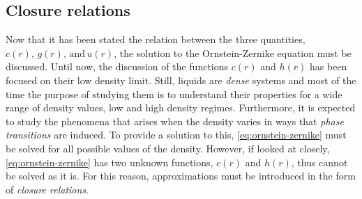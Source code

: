 \subsection{Closure relations}
Now that it has been stated the relation between the three quantities, 
$c(r), \, g(r), \, \text{and} \, u(r)$, the solution to the Ornstein-Zernike equation
must be discussed. Until now, the discussion of the functions $c(r)$ and $h(r)$ has been
focused on their low density limit. Still, liquids are \emph{dense} systems and most of
the time the purpose of studying them is to understand their properties for a wide range
of density values, low and high density regimes. 
Furthermore, it is expected to study the phenomena that
arises when the density varies in ways that \emph{phase transitions} are induced.
To provide a solution to this, \autoref{eq:ornstein-zernike} must be solved for all possible
values of the density. However, if looked at closely, \autoref{eq:ornstein-zernike} has
two unknown functions, $c(r)$ and $h(r)$, thus cannot be solved as it is. For this reason,
approximations must be introduced in the form of \emph{closure relations}.

